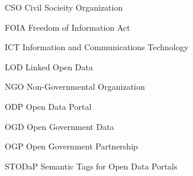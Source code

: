 
\begin{siglas}
  \item [CSO] Civil Socieity Organization
  \item [FOIA] Freedom of Information Act
  \item [ICT] Information and Communications Technology
  \item [LOD] Linked Open Data
  \item [NGO] Non-Governmental Organization
  \item [ODP] Open Data Portal
  \item [OGD] Open Government Data
  \item [OGP] Open Government Partnership
  \item [STODaP] Semantic Tags for Open Data Portals
\end{siglas}

